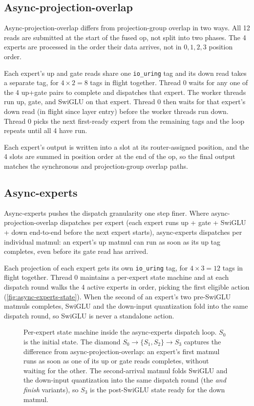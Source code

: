 \subsection{Async-projection-overlap}\label{sec:pipelining-apo}

Async-projection-overlap differs from projection-group overlap in two ways.
All 12 reads are submitted at the start of the fused op, not split into two phases.
The 4 experts are processed in the order their data arrives, not in $0, 1, 2, 3$ position order.

Each expert's up and gate reads share one \texttt{io\_uring} tag and its down read takes a separate tag, for $4 \times 2 = 8$ tags in flight together.
Thread 0 waits for any one of the 4 up+gate pairs to complete and dispatches that expert.
The worker threads run up, gate, and SwiGLU on that expert.
Thread 0 then waits for that expert's down read (in flight since layer entry) before the worker threads run down.
Thread 0 picks the next first-ready expert from the remaining tags and the loop repeats until all 4 have run.

Each expert's output is written into a slot at its router-assigned position, and the 4 slots are summed in position order at the end of the op, so the final output matches the synchronous and projection-group overlap paths.


\subsection{Async-experts}\label{sec:pipelining-ae}

Async-experts pushes the dispatch granularity one step finer.
Where async-projection-overlap dispatches per expert (each expert runs up + gate + SwiGLU + down end-to-end before the next expert starts), async-experts dispatches per individual matmul: an expert's up matmul can run as soon as its up tag completes, even before its gate read has arrived.

Each projection of each expert gets its own \texttt{io\_uring} tag, for $4 \times 3 = 12$ tags in flight together.
Thread 0 maintains a per-expert state machine and at each dispatch round walks the 4 active experts in order, picking the first eligible action (\autoref{fig:async-experts-state}).
When the second of an expert's two pre-SwiGLU matmuls completes, SwiGLU and the down-input quantization fold into the same dispatch round, so SwiGLU is never a standalone action.

\begin{figure}[htbp]
\centering
\resizebox{0.85\textwidth}{!}{}
\caption[Per-expert state machine for async-experts]{Per-expert state machine inside the async-experts dispatch loop. $S_0$ is the initial state. The diamond $S_0 \to \{S_1, S_2\} \to S_3$ captures the difference from async-projection-overlap: an expert's first matmul runs as soon as one of its up or gate reads completes, without waiting for the other. The second-arrival matmul folds SwiGLU and the down-input quantization into the same dispatch round (the \emph{and finish} variants), so $S_3$ is the post-SwiGLU state ready for the down matmul.}
\label{fig:async-experts-state}
\end{figure}

